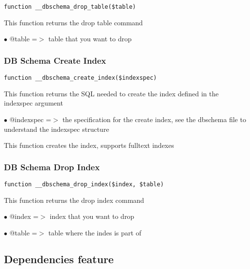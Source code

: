 \documentclass[a4paper]{article}
\begin{document}
\begin{lstlisting}
function __dbschema_drop_table($table)
\end{lstlisting}

This function returns the drop table command

\begin{compactitem}
\item[\color{myblue}$\bullet$] @table =$>$ table that you want to drop
\end{compactitem}

\hypertarget{toc434}{}
\subsubsection{DB Schema Create Index}

\begin{lstlisting}
function __dbschema_create_index($indexspec)
\end{lstlisting}

This function returns the SQL needed to create the index defined in the
indexspec argument

\begin{compactitem}
\item[\color{myblue}$\bullet$] @indexspec =$>$ the specification for the create index, see the dbschema
              file to understand the indexspec structure
\end{compactitem}

This function creates the index, supports fulltext indexes

\hypertarget{toc435}{}
\subsubsection{DB Schema Drop Index}

\begin{lstlisting}
function __dbschema_drop_index($index, $table)
\end{lstlisting}

This function returns the drop index command

\begin{compactitem}
\item[\color{myblue}$\bullet$] @index =$>$ index that you want to drop
\item[\color{myblue}$\bullet$] @table =$>$ table where the indes is part of
\end{compactitem}

\hypertarget{toc436}{}
\subsection{Dependencies feature}
\end{document}
